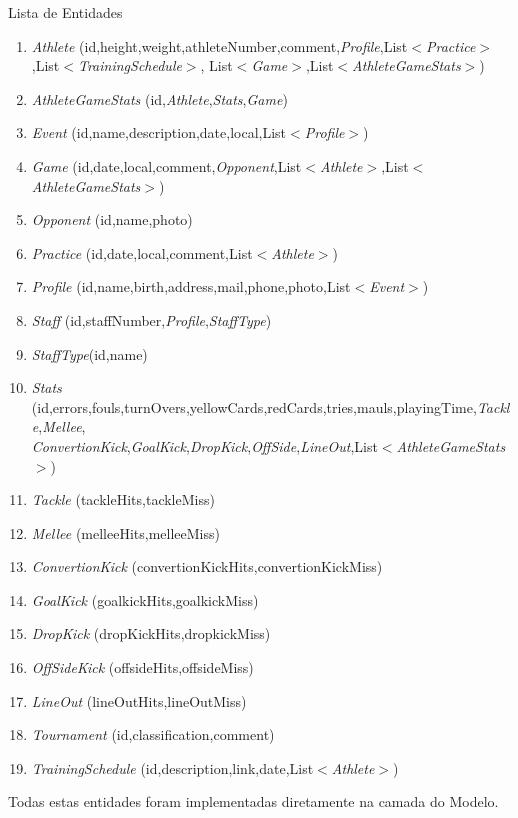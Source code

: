 Lista de Entidades
\begin{enumerate}
	\item \emph{Athlete}	(id,height,weight,athleteNumber,comment,\emph{Profile},List$<$\emph{Practice}$>$,List$<$\emph{TrainingSchedule}$>$,
	List$<$\emph{Game}$>$,List$<$\emph{AthleteGameStats}$>$)
	\item \emph{AthleteGameStats} (id,\emph{Athlete},\emph{Stats},\emph{Game})
	\item \emph{Event} (id,name,description,date,local,List$<$\emph{Profile}$>$)
	\item \emph{Game} (id,date,local,comment,\emph{Opponent},List$<$\emph{Athlete}$>$,List$<$\emph{AthleteGameStats}$>$)
	\item \emph{Opponent}
	(id,name,photo)
	\item \emph{Practice} (id,date,local,comment,List$<$\emph{Athlete}$>$)
	\item \emph{Profile} (id,name,birth,address,mail,phone,photo,List$<$\emph{Event}$>$)
	\item \emph{Staff} (id,staffNumber,\emph{Profile},\emph{StaffType})
	\item \emph{StaffType}(id,name)
	\item \emph{Stats} (id,errors,fouls,turnOvers,yellowCards,redCards,tries,mauls,playingTime,\emph{Tackle},\emph{Mellee},\\
	\emph{ConvertionKick},\emph{GoalKick},\emph{DropKick},\emph{OffSide},\emph{LineOut},List$<$\emph{AthleteGameStats}$>$)
	\item \emph{Tackle} (tackleHits,tackleMiss)
	\item \emph{Mellee} (melleeHits,melleeMiss)
	\item \emph{ConvertionKick} (convertionKickHits,convertionKickMiss)
	\item \emph{GoalKick} (goalkickHits,goalkickMiss)
	\item \emph{DropKick} (dropKickHits,dropkickMiss)
	\item \emph{OffSideKick} (offsideHits,offsideMiss)
	\item \emph{LineOut} (lineOutHits,lineOutMiss)
	\item \emph{Tournament} (id,classification,comment)
	\item \emph{TrainingSchedule} (id,description,link,date,List$<$\emph{Athlete}$>$)
\end{enumerate}
Todas estas entidades foram implementadas diretamente na camada do Modelo.
\newpage